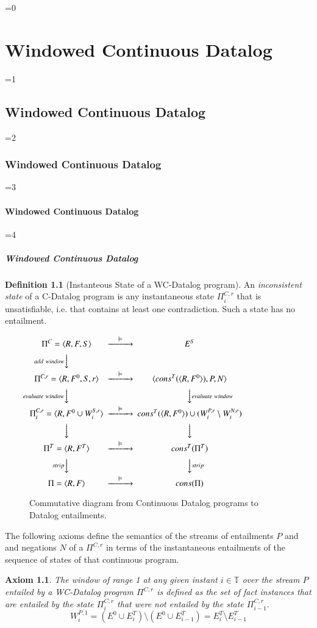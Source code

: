 \documentclass[twocolumn,preprint,3p,number]{elsarticle}
\theoremstyle{plain}
\newtheorem{axiom}{Axiom}
\theoremstyle{definition}
\newtheorem{definition}{Definition}
\newcounter{nestingdepth}
\newenvironment{nestedsection}[2]{
  \ifnum\value{nestingdepth}=0
    \chapter{#1}
  \else
    \ifnum\value{nestingdepth}=1
      \section{#1}
    \else
      \ifnum\value{nestingdepth}=2
        \subsection{#1}
      \else
        \ifnum\value{nestingdepth}=3
          \subsubsection{#1}
        \else
          \ifnum\value{nestingdepth}=4
            \paragraph{#1}
          \else
            \PackageError{nestedsections}{Maximum nesting level exceeded!}{uh oh!}
          \fi
        \fi
      \fi
    \fi
  \fi
  \addtocounter{nestingdepth}{1}
  \label{sec:#2}
}{\addtocounter{nestingdepth}{-1}}
\def\labelfig#1{\label{fig:#1}}
\begin{document}
\begin{nestedsection}{Windowed Continuous Datalog}{semantics}
\begin{definition}[Instanteous State of a WC-Datalog program]
An \emph{inconsistent state} of a C-Datalog program is any instantaneous
state $\Pi^{C,r}_i$ that is unsatisfiable, i.e. that contains at least
one contradiction.  Such a state has no entailment.

\end{definition}

\begin{figure}
\centering
$
\begin{CD}
  {\Pi^C = \langle R, F, S \rangle} @>\models>> {E^S} \\
  @V{add\ window}VV \\
        {\Pi^{C,r} = \langle R, F^0, S, r \rangle} @>\models>> {\langle cons^T(\langle R, F^0\rangle), P, N \rangle} \\
        @V{evaluate\ window}VV @VV{evaluate\ window}V \\
        {\Pi^{C,r}_i = \langle R, F^0 \cup W^{S,r}_i \rangle} @>\models>> {cons^T(\langle R, F^0 \rangle) \cup (W^{P,r}_i \setminus W^{N,r}_i)} \\
  @VVV @VVV \\
        {\Pi^T = \langle R, F^T \rangle } @>\models>> {cons^T(\Pi^T)} \\
  @V{strip}VV @VV{strip}V \\
        {\Pi = \langle R, F \rangle } @>\models>> {cons(\Pi)}
\end{CD}
$
\caption{Commutative diagram from Continuous Datalog programs to Datalog entailments.}
\labelfig{CD-TD-D}
\end{figure}

The following axioms define the semantics of the streams of
entailments $P$ and and negations $N$ of a $\Pi^{C,r}$ in terms of the
instantaneous entailments of the sequence of states of that continuous
program.

{\nobreak\begin{axiom}
\label{axiom:continuous datalog: positive window increment}
The window of range 1 at any given instant ${i \in \mathbb{T}}$ over
the stream $P$ entailed by a WC-Datalog program $\Pi^{C,r}$ is defined
as the set of fact instances that are entailed by the state
$\Pi^{C,r}_i$ that were not entailed by the state $\Pi^{C,r}_{i-1}$.
\begin{equation*}
W^{P,1}_{i} = \left( E^0 \cup E^T_{i} \right) \setminus
\left( E^0 \cup E^T_{i-1} \right) = E^T_{i} \setminus E^T_{i-1}
\end{equation*}
\end{axiom}}


\end{nestedsection}
\end{document}
